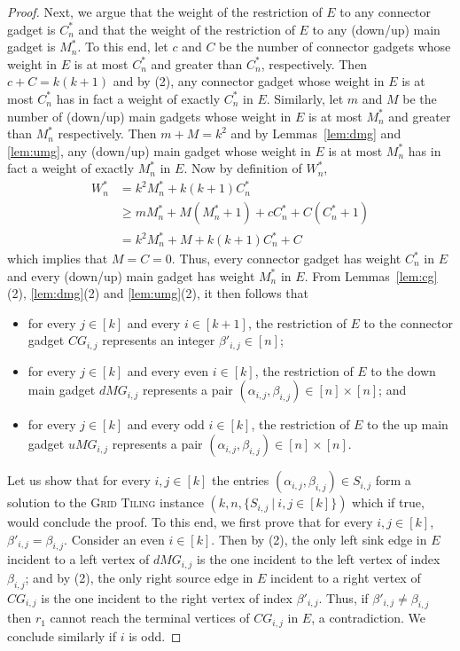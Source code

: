 \documentclass[a4paper,11pt]{article}
\theoremstyle{plain}
\newtheorem{identification rule}{Identification Rule}
\theoremstyle{definition}
\theoremstyle{remark}
\begin{document}
\begin{proof}
Next, we argue that the weight of the restriction of $E$ to any connector gadget is $C_n^*$ and that the weight of the restriction of $E$ to any (down/up) main gadget is $M_n^*$. To this end, let $c$ and $C$ be the number of connector gadgets whose weight in $E$ is at most $C_n^*$ and greater than $C_n^*$, respectively. Then $c+C=k(k+1)$ and by (2), any connector gadget whose weight in $E$ is at most $C_n^*$ has in fact a weight of exactly $C_n^*$ in $E$. Similarly, let $m$ and $M$ be the number of (down/up) main gadgets whose weight in $E$ is at most $M_n^*$ and greater than $M_n^*$ respectively. Then $m + M = k^2$ and by Lemmas~\ref{lem:dmg} and \ref{lem:umg}, any (down/up) main gadget whose weight in $E$ is at most $M_n^*$ has in fact a weight of exactly $M_n^*$ in $E$. Now by definition of $W_n^*$, 
\begin{equation*}
\begin{split}
W_n^*& = k^2M_n^* + k(k+1)C_n^*\\
& \geq mM_n^* + M(M_n^*+1) + cC_n^* + C(C_n^*+1)\\
& = k^2M_n^* + M + k(k+1)C_n^* + C
\end{split}
\end{equation*}  
which implies that $M = C = 0$. Thus, every connector gadget has weight $C_n^*$ in $E$ and every (down/up) main gadget has weight $M_n^*$ in $E$. From Lemmas~\ref{lem:cg}(2), \ref{lem:dmg}(2) and \ref{lem:umg}(2), it then follows that
\begin{itemize}
\item for every $j \in [k]$ and every $i \in [k+1]$, the restriction of $E$ to the connector gadget $CG_{i,j}$ represents an integer $\beta'_{i,j} \in [n]$;
\item for every $j \in [k]$ and every even $i \in [k]$, the restriction of $E$ to the down main gadget $dMG_{i,j}$ represents a pair $(\alpha_{i,j},\beta_{i,j}) \in [n] \times [n]$; and
\item for every $j \in [k]$ and every odd $i \in [k]$, the restriction of $E$ to the up main gadget $uMG_{i,j}$ represents a pair $(\alpha_{i,j},\beta_{i,j}) \in [n] \times [n]$.
\end{itemize}
Let us show that for every $i,j \in [k]$ the entries $(\alpha_{i,j},\beta_{i,j}) \in S_{i,j}$ form a solution to the \textsc{Grid Tiling} instance $(k,n,\{S_{i,j}~|~i,j \in [k]\})$ which if true, would conclude the proof. To this end, we first prove that for every $i,j \in [k]$, $\beta'_{i,j} = \beta_{i,j}$. Consider an even $i \in [k]$. Then by (2), the only left sink edge in $E$ incident to a left vertex of $dMG_{i,j}$ is the one incident to the left vertex of index $\beta_{i,j}$; and by (2), the only right source edge in $E$ incident to a right vertex of $CG_{i,j}$ is the one incident to the right vertex of index $\beta'_{i,j}$. Thus, if $\beta'_{i,j} \neq \beta_{i,j}$ then $r_1$ cannot reach the terminal vertices of $CG_{i,j}$ in $E$, a contradiction. We conclude similarly if $i$ is odd. 


\end{proof}
\end{document}
